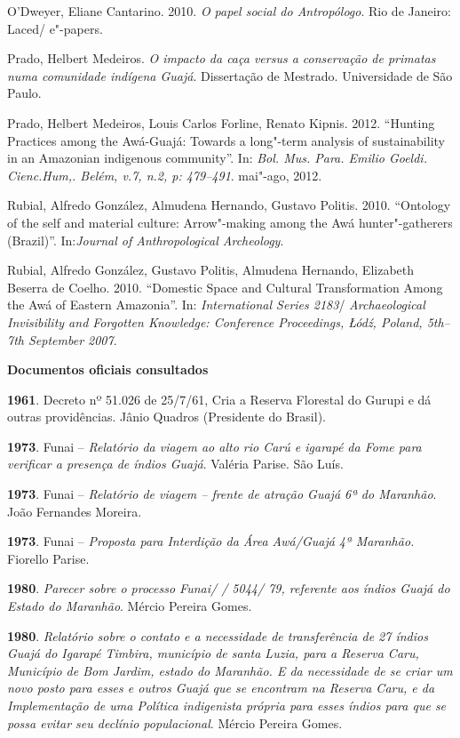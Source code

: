 O'Dweyer, Eliane Cantarino. 2010. \emph{O papel social do Antropólogo}.
Rio de Janeiro: Laced/ e"-papers.

Prado, Helbert Medeiros. \emph{O impacto da caça versus a conservação de
primatas numa comunidade indígena Guajá}. Dissertação de Mestrado.
Universidade de São Paulo.

Prado, Helbert Medeiros, Louis Carlos Forline, Renato Kipnis. 2012.
``Hunting Practices among the Awá-Guajá: Towards a long"-term analysis of
sustainability in an Amazonian indigenous community''. In: \emph{Bol. Mus.
Para. Emilio Goeldi. Cienc.Hum,. Belém, v.7, n.2, p: 479--491}. mai"-ago,
2012.

Rubial, Alfredo González, Almudena Hernando, Gustavo Politis. 2010.
``Ontology of the self and material culture: Arrow"-making among the Awá
hunter"-gatherers (Brazil)''. In:\emph{Journal of Anthropological
Archeology}.

Rubial, Alfredo González, Gustavo Politis, Almudena Hernando, Elizabeth
Beserra de Coelho. 2010. ``Domestic Space and Cultural Transformation
Among the Awá of Eastern Amazonia''. In: \emph{ International Series
2183}/ \emph{Archaeological Invisibility and Forgotten Knowledge:
Conference Proceedings, Łódź, Poland, 5th--7th September 2007}.

\textbf{Documentos oficiais consultados}

\textbf{1961}. Decreto nº 51.026 de 25/7/61, Cria a Reserva Florestal do
Gurupi e dá outras providências. Jânio Quadros (Presidente do Brasil).

\textbf{1973}. Funai -- \emph{Relatório da viagem ao alto rio Carú e
igarapé da Fome para verificar a presença de índios Guajá}. Valéria
Parise. São Luís.

\textbf{1973}. Funai -- \emph{Relatório de viagem -- frente de atração
Guajá 6ª do Maranhão}. João Fernandes Moreira.

\textbf{1973}. Funai -- \emph{Proposta para Interdição da Área Awá/Guajá
4ª  Maranhão.} Fiorello Parise.

\textbf{1980}. \emph{Parecer sobre o processo Funai/ / 5044/ 79,
referente aos índios Guajá do Estado do Maranhão}. Mércio Pereira Gomes.

\textbf{1980}. \emph{Relatório sobre o contato e a necessidade de
transferência de 27 índios Guajá do Igarapé Timbira, município de santa
Luzia, para a Reserva Caru, Município de Bom Jardim, estado do Maranhão.
E da necessidade de se criar um novo posto para esses e outros Guajá que
se encontram na Reserva Caru, e da Implementação de uma Política
indigenista própria para esses índios para que se possa evitar seu
declínio populacional}. Mércio Pereira Gomes.

